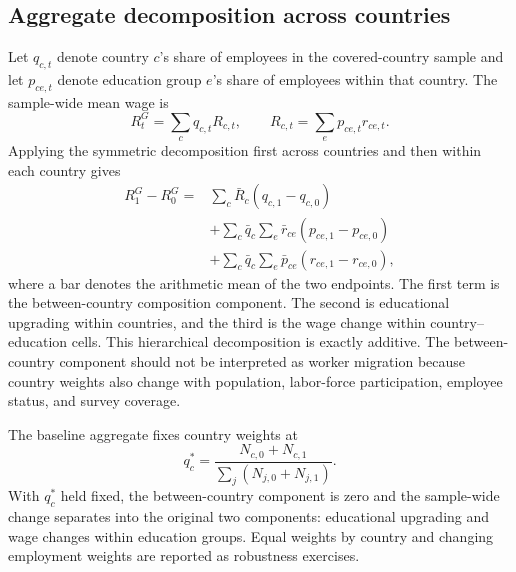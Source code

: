 \subsection{Aggregate decomposition across countries}

Let \(q_{c,t}\) denote country \(c\)'s share of employees in the covered-country
sample and let \(p_{ce,t}\) denote education group \(e\)'s share of employees
within that country. The sample-wide mean wage is
\begin{equation}
  R_t^{G}
  =
  \sum_c q_{c,t} R_{c,t},
  \qquad
  R_{c,t}
  =
  \sum_e p_{ce,t} r_{ce,t}.
  \label{eq:global_wage_identity}
\end{equation}
Applying the symmetric decomposition first across countries and then within
each country gives
\begin{align}
  R_1^{G}-R_0^{G}
  ={}&
  \sum_c \bar{R}_c\left(q_{c,1}-q_{c,0}\right)
  \nonumber\\
  &+
  \sum_c \bar{q}_c
  \sum_e \bar{r}_{ce}\left(p_{ce,1}-p_{ce,0}\right)
  \nonumber\\
  &+
  \sum_c \bar{q}_c
  \sum_e \bar{p}_{ce}\left(r_{ce,1}-r_{ce,0}\right),
  \label{eq:global_symmetric_decomposition}
\end{align}
where a bar denotes the arithmetic mean of the two endpoints. The first term
is the between-country composition component. The second is educational
upgrading within countries, and the third is the wage change within
country--education cells. This hierarchical decomposition is exactly
additive. The between-country component should not be interpreted as worker
migration because country weights also change with population, labor-force
participation, employee status, and survey coverage.

The baseline aggregate fixes country weights at
\begin{equation}
  q_c^{*}
  =
  \frac{N_{c,0}+N_{c,1}}
       {\sum_j\left(N_{j,0}+N_{j,1}\right)}.
  \label{eq:fixed_country_weights}
\end{equation}
With \(q_c^{*}\) held fixed, the between-country component is zero and the
sample-wide change separates into the original two components: educational
upgrading and wage changes within education groups. Equal weights by country
and changing employment weights are reported as robustness exercises.
